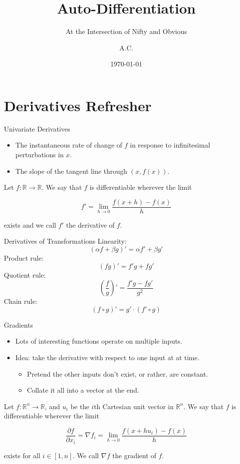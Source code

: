 \documentclass[pdf]{beamer}
\title{Auto-Differentiation}
\subtitle{At the Intersection of Nifty and Obvious}
\author{A.C.}
\date{\today}
\begin{document}
\begin{frame}
  \titlepage
\end{frame}

\section{Derivatives Refresher}
\begin{frame}{Univariate Derivatives}
  \begin{itemize}
  \item The instantaneous rate of change of $f$ in response to infinitesimal
    perturbations in $x$.
  \item The slope of the tangent line through $(x,f(x))$.
  \end{itemize}
  \pause
  \begin{definition}
    Let $f:\mathbb{R}\rightarrow\mathbb{R}$. We say that $f$ is differentiable
    wherever the limit

    \[ f' = \lim_{h \rightarrow 0} \frac{f(x+h)-f(x)}{h} \]

    exists and we call $f'$ the derivative of $f$.
  \end{definition}
\end{frame}

\begin{frame}{Derivatives of Transformations}
  Linearity: \[(\alpha f+ \beta g)' = \alpha f' + \beta g'\]
  \pause
  Product rule: \[(fg)' = f'g + fg'\]
  \pause
  Quotient rule: \[\left(\frac{f}{g}\right)' = \frac{f'g - fg'}{g^2}\]
  \pause
  Chain rule: \[(f \circ g)' = g' \cdot (f' \circ g)\]
\end{frame}

\begin{frame}{Gradients}
  \begin{itemize}
  \item Lots of interesting functions operate on multiple inputs.
  \pause
  \item Idea: take the derivative with respect to one input at at time.
    \begin{itemize}
    \item Pretend the other inputs don't exist, or rather, are constant.
    \item Collate it all into a vector at the end.
    \end{itemize}
  \end{itemize}
  \pause
  \begin{definition}
    Let $f:\mathbb{R}^n\rightarrow\mathbb{R}$, and $u_i$ be the $i$th Cartesian
    unit vector in $\mathbb{R}^n$. We say that $f$ is differentiable wherever
    the limit

    \[ \frac{\partial f}{\partial x_i} = {\nabla f}_i = \lim_{h \rightarrow 0} \frac{f(x + hu_i)-f(x)}{h} \]

    exists for all $i \in [1,n]$. We call $\nabla f$ the gradient of $f$.
  \end{definition}
\end{frame}
\end{document}
